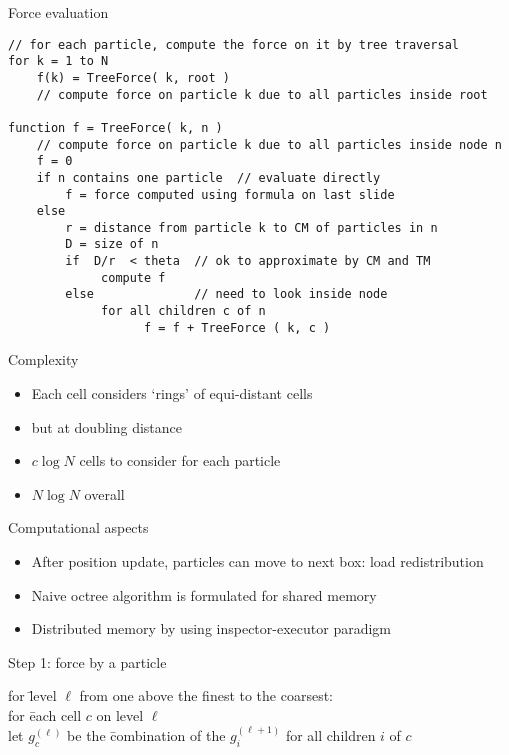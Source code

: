 \begin{frame}[fragile]{Force evaluation}
\small
\begin{verbatim}
// for each particle, compute the force on it by tree traversal
for k = 1 to N
    f(k) = TreeForce( k, root )   
    // compute force on particle k due to all particles inside root

function f = TreeForce( k, n )   
    // compute force on particle k due to all particles inside node n
    f = 0
    if n contains one particle  // evaluate directly
        f = force computed using formula on last slide
    else
        r = distance from particle k to CM of particles in n
        D = size of n
        if  D/r  < theta  // ok to approximate by CM and TM
             compute f 
        else              // need to look inside node
             for all children c of n
                   f = f + TreeForce ( k, c )
\end{verbatim}
\end{frame}

\begin{frame}{Complexity}
  \begin{itemize}
  \item Each cell considers `rings' of equi-distant cells
  \item but at doubling distance
  \item $c\log N$ cells to consider for each particle
  \item $N\log N$ overall
  \end{itemize}  
\end{frame}

\begin{frame}{Computational aspects}
  \begin{itemize}
  \item After position update, particles can move to next box: load redistribution
  \item Naive octree algorithm is formulated for shared memory
  \item Distributed memory by using inspector-executor paradigm
  \end{itemize}
\end{frame}

\begin{frame}{Step 1: force by a particle}
  \begin{tabbing}
    for \=level $\ell$ from one above the finest to the coarsest:\\
    \>for \=each cell $c$ on level $\ell$\\
    \>\>let $g^{(\ell)}_c$ be the \=combination of the $g^{(\ell+1)}_i$
    for all children $i$ of $c$
  \end{tabbing}
\end{frame}

